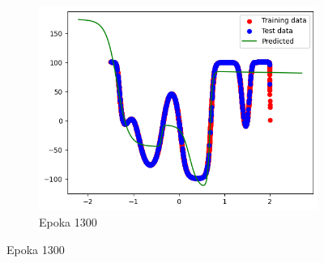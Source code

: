 \documentclass{article}
\begin{document}
\begin{figure}[H]
\begin{subfigure}{0.32\textwidth}
        \includegraphics[width=\linewidth]{img/ae3/mml6.png}
        \caption{Epoka 1300}
    \end{subfigure}
\end{figure}
\end{document}
